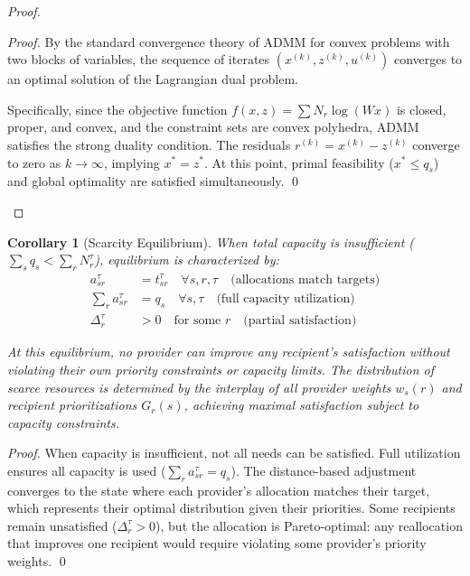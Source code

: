 \documentclass[11pt]{article}
\newtheorem{corollary}{Corollary}
\begin{document}
\begin{proof}
\begin{proof}
By the standard convergence theory of ADMM for convex problems with two blocks of variables, the sequence of iterates $(x^{(k)}, z^{(k)}, u^{(k)})$ converges to an optimal solution of the Lagrangian dual problem. 

Specifically, since the objective function $f(x,z) = \sum N_r \log(W x)$ is closed, proper, and convex, and the constraint sets are convex polyhedra, ADMM satisfies the strong duality condition. The residuals $r^{(k)} = x^{(k)} - z^{(k)}$ converge to zero as $k \to \infty$, implying $x^* = z^*$. At this point, primal feasibility ($x^* \le q_s$) and global optimality are satisfied simultaneously.
\qed 
\end{proof}
\end{proof}

\begin{corollary}[Scarcity Equilibrium]
\label{cor:scarcity-equilibrium}
When total capacity is insufficient ($\sum_s q_s < \sum_r N_r^\tau$), equilibrium is characterized by:
\begin{align}
a_{sr}^\tau &= t_{sr}^\tau \quad \forall s,r,\tau \quad \text{(allocations match targets)} \\
\sum_r a_{sr}^\tau &= q_s \quad \forall s,\tau \quad \text{(full capacity utilization)} \\
\Delta_r^\tau &> 0 \quad \text{for some } r \quad \text{(partial satisfaction)}
\end{align}

At this equilibrium, no provider can improve any recipient's satisfaction without violating their own priority constraints or capacity limits. The distribution of scarce resources is determined by the interplay of all provider weights $w_s(r)$ and recipient prioritizations $G_r(s)$, achieving maximal satisfaction subject to capacity constraints.
\end{corollary}

\begin{proof}
When capacity is insufficient, not all needs can be satisfied. Full utilization ensures all capacity is used ($\sum_r a_{sr}^\tau = q_s$). The distance-based adjustment converges to the state where each provider's allocation matches their target, which represents their optimal distribution given their priorities. Some recipients remain unsatisfied ($\Delta_r^\tau > 0$), but the allocation is Pareto-optimal: any reallocation that improves one recipient would require violating some provider's priority weights. \qed
\end{proof}
\end{document}
